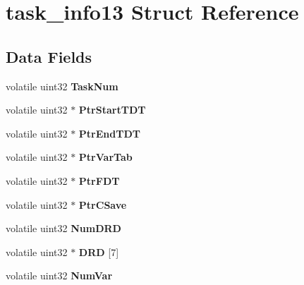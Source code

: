 \hypertarget{structtask__info13}{}\section{task\+\_\+info13 Struct Reference}
\label{structtask__info13}
\subsection*{Data Fields}
\begin{DoxyCompactItemize}
\item 
\mbox{\label{structtask__info13_afe55869a5707b5d0fee67916b9789b59}} 
volatile uint32 {\bfseries Task\+Num}
\item 
\mbox{\label{structtask__info13_affa98fb26db51be780ffb847d210ffe3}} 
volatile uint32 $\ast$ {\bfseries Ptr\+Start\+T\+DT}
\item 
\mbox{\label{structtask__info13_a90d3d22499d2bb9114bd73550e6560b8}} 
volatile uint32 $\ast$ {\bfseries Ptr\+End\+T\+DT}
\item 
\mbox{\label{structtask__info13_a970dc4712b693f782a1cec69907f5ffc}} 
volatile uint32 $\ast$ {\bfseries Ptr\+Var\+Tab}
\item 
\mbox{\label{structtask__info13_aff3834199bd4debe501c37498ddda359}} 
volatile uint32 $\ast$ {\bfseries Ptr\+F\+DT}
\item 
\mbox{\label{structtask__info13_ae038f96a22b31927239bbf3932ef01f8}} 
volatile uint32 $\ast$ {\bfseries Ptr\+C\+Save}
\item 
\mbox{\label{structtask__info13_a1cba1dc898c5d53282398c851356fc17}} 
volatile uint32 {\bfseries Num\+D\+RD}
\item 
\mbox{\label{structtask__info13_a07b3d92c6316cbed4b7c87accfe661fd}} 
volatile uint32 $\ast$ {\bfseries D\+RD} \mbox{[}7\mbox{]}
\item 
\mbox{\label{structtask__info13_aaac23c3285201df643fcc4b37af4237d}} 
volatile uint32 {\bfseries Num\+Var}

\end{DoxyCompactItemize}
